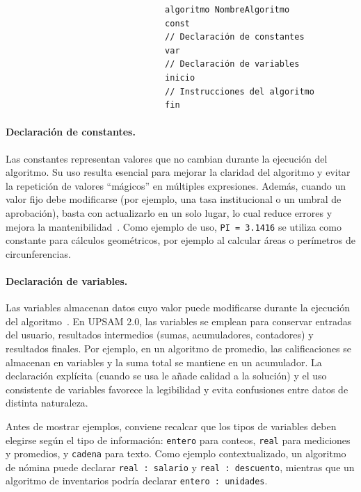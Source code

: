 \documentclass[12pt,twoside]{book}
\begin{document}
							\begin{verbatim}
								algoritmo NombreAlgoritmo
								const
								// Declaración de constantes
								var
								// Declaración de variables
								inicio
								// Instrucciones del algoritmo
								fin
							\end{verbatim}
							
						\paragraph{Declaración de constantes.}
							Las constantes representan valores que no cambian durante la ejecución del algoritmo. Su uso resulta esencial para mejorar la claridad del algoritmo y evitar la repetición de valores ``mágicos'' en múltiples expresiones. Además, cuando un valor fijo debe modificarse (por ejemplo, una tasa institucional o un umbral de aprobación), basta con actualizarlo en un solo lugar, lo cual reduce errores y mejora la mantenibilidad~\cite{Martin2008Clean,McConnell2004Code}. Como ejemplo de uso, \texttt{PI = 3.1416} se utiliza como constante para cálculos geométricos, por ejemplo al calcular áreas o perímetros de circunferencias.
							
						\paragraph{Declaración de variables.}
							Las variables almacenan datos cuyo valor puede modificarse durante la ejecución del algoritmo~\cite{Path2019Introduction}. En UPSAM 2.0, las variables se emplean para conservar entradas del usuario, resultados intermedios (sumas, acumuladores, contadores) y resultados finales. Por ejemplo, en un algoritmo de promedio, las calificaciones se almacenan en variables y la suma total se mantiene en un acumulador. La declaración explícita (cuando se usa le añade calidad a la solución) y el uso consistente de variables favorece la legibilidad y evita confusiones entre datos de distinta naturaleza.
							
							Antes de mostrar ejemplos, conviene recalcar que los tipos de variables deben elegirse según el tipo de información: \texttt{entero} para conteos, \texttt{real} para mediciones y promedios, y \texttt{cadena} para texto. Como ejemplo contextualizado, un algoritmo de nómina puede declarar \texttt{real : salario} y \texttt{real : descuento}, mientras que un algoritmo de inventarios podría declarar \texttt{entero : unidades}.
							
\end{document}
